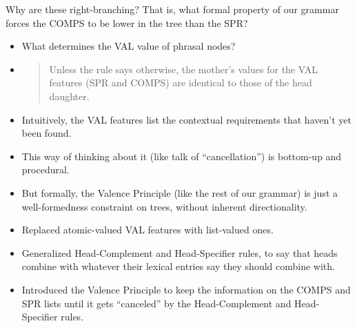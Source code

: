 \documentclass[a4paper,landscape,headrule,footrule]{foils}
\begin{document}


Why are these right-branching? That is, what formal property of our
grammar forces the COMPS to be lower in the tree than the SPR?

\begin{center}
  \begin{tree}
  \end{tree}
  \begin{tree}
  \end{tree}
\end{center}


\begin{itemize}
\item What determines the VAL value of phrasal nodes?
\item {}
  \begin{quote}
    Unless the rule says otherwise, the mother’s
    values for the VAL features (SPR and
    COMPS) are identical to those of the head
    daughter.
  \end{quote}
\end{itemize}


\begin{itemize}
\item Intuitively, the VAL features list the contextual
requirements that haven’t yet been found.
\item This way of thinking about it (like talk of
“cancellation”) is bottom-up and procedural.
\item But formally, the Valence Principle (like the rest of
our grammar) is just a well-formedness constraint
on trees, without inherent directionality.

\end{itemize}

\begin{itemize}
\item Replaced atomic-valued VAL features with list-valued
ones.
\item Generalized Head-Complement and Head-Specifier
rules, to say that heads combine with whatever their
lexical entries say they should combine with.
\item Introduced the Valence Principle to keep the information on the
  COMPS and SPR lists until it gets ``canceled'' by the
  Head-Complement and Head-Specifier rules.
\end{itemize}
\end{document}
